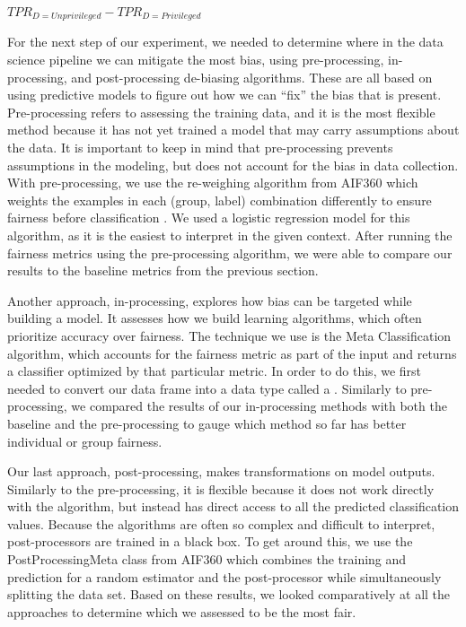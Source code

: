 \documentclass[water,article,submit,moreauthors,pdftex]{mdpi}
\begin{document}
\(TPR_{D = Unprivileged} - TPR_{D = Privileged}\)

For the next step of our experiment, we needed to determine where in the
data science pipeline we can mitigate the most bias, using
pre-processing, in-processing, and post-processing de-biasing
algorithms. These are all based on using predictive models to figure out
how we can ``fix'' the bias that is present. Pre-processing refers to
assessing the training data, and it is the most flexible method because
it has not yet trained a model that may carry assumptions about the
data. It is important to keep in mind that pre-processing prevents
assumptions in the modeling, but does not account for the bias in data
collection. With pre-processing, we use the re-weighing algorithm from
AIF360 which weights the examples in each (group, label) combination
differently to ensure fairness before classification
\citep{aif360-oct-2018}. We used a logistic regression model for this
algorithm, as it is the easiest to interpret in the given context. After
running the fairness metrics using the pre-processing algorithm, we were
able to compare our results to the baseline metrics from the previous
section.

Another approach, in-processing, explores how bias can be targeted while
building a model. It assesses how we build learning algorithms, which
often prioritize accuracy over fairness. The technique we use is the
Meta Classification algorithm, which accounts for the fairness metric as
part of the input and returns a classifier optimized by that particular
metric. In order to do this, we first needed to convert our data frame
into a data type called a . Similarly to pre-processing, we compared the
results of our in-processing methods with both the baseline and the
pre-processing to gauge which method so far has better individual or
group fairness.

Our last approach, post-processing, makes transformations on model
outputs. Similarly to the pre-processing, it is flexible because it does
not work directly with the algorithm, but instead has direct access to
all the predicted classification values. Because the algorithms are
often so complex and difficult to interpret, post-processors are trained
in a black box. To get around this, we use the PostProcessingMeta class
from AIF360 which combines the training and prediction for a random
estimator and the post-processor while simultaneously splitting the data
set. Based on these results, we looked comparatively at all the
approaches to determine which we assessed to be the most fair.
\end{document}
